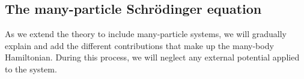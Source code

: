 \subsection{The many-particle Schrödinger equation}
As we extend the theory to include many-particle systems, we will gradually explain and add the different contributions that make up the many-body Hamiltonian. During this process, we will neglect any external potential applied to the system. 


